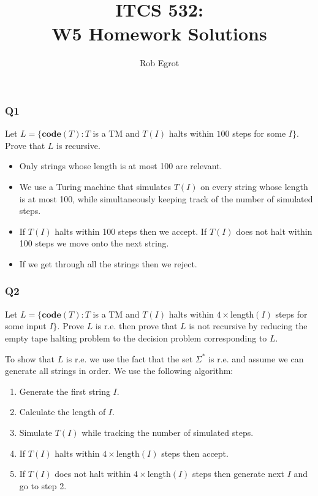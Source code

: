 \documentclass[handout]{beamer}
\title{ITCS 532:\\ W5 Homework Solutions}
\date{}
\author{Rob Egrot}
\newcommand{\co}{\mathbf{code}}
\begin{document}
\begin{frame}
\titlepage
\end{frame}

\begin{frame}
\frametitle{Q1}
Let $L=\{\co(T):T$ is a TM and $T(I)$ halts within $100$ steps for some $I\}$. Prove that $L$ is recursive.
\vspace{0.5cm}
\begin{itemize}
\item Only strings whose length is at most 100 are relevant. 
\vspace{0.2cm}
\item We use a Turing machine that simulates $T(I)$ on every string whose length is at most 100, while simultaneously keeping track of the number of simulated steps. 
\vspace{0.2cm}
\item If $T(I)$ halts within 100 steps then we accept. If $T(I)$ does not halt within 100 steps we move onto the next string. 
\vspace{0.2cm}
\item If we get through all the strings then we reject. 
\end{itemize}
\end{frame}

\begin{frame}
\frametitle{Q2}
Let $L=\{\co(T): T$ is a TM and $T(I)$ halts within $4\times$length$(I)$ steps for some input $I\}$. Prove $L$ is r.e. then prove that $L$ is not recursive by reducing the empty tape halting problem to the decision problem corresponding to $L$. 

\vspace{0.5cm}
To show that $L$ is r.e. we use the fact that the set $\Sigma^*$ is r.e. and assume we can generate all strings in order. We use the following algorithm:
\begin{enumerate}
\item Generate the first string $I$.
\item Calculate the length of $I$.
\item Simulate $T(I)$ while tracking the number of simulated steps.
\item If $T(I)$ halts within $4\times$length$(I)$ steps then accept.
\item If $T(I)$ does not halt within $4\times$length$(I)$ steps then generate next $I$ and go to step 2. 
\end{enumerate}
\end{frame}
\end{document}
